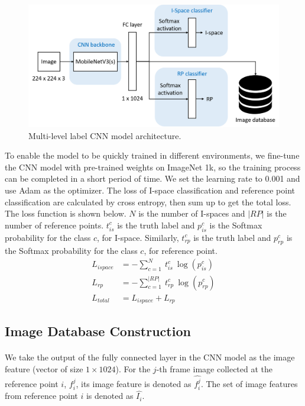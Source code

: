 \documentclass[a4paper,12pt]{report}
\begin{document}
\paragraph{}
\begin{figure}[h]
    \centering
    \includegraphics[width=0.8\columnwidth]{images/chap3/cnn_model.png}
    \caption{Multi-level label CNN model architecture.}
    \label{Fig:cnn_model}
\end{figure}
To enable the model to be quickly trained in different environments, we fine-tune the CNN model with pre-trained weights on ImageNet 1k, so the training process can be completed in a short period of time. We set the learning rate to 0.001 and use Adam as the optimizer. The loss of I-space classification and reference point classification are calculated by cross entropy, then sum up to get the total loss. The loss function is shown below. $N$ is the number of I-spaces and $|RP|$ is the number of reference points. $t_{is}^c$ is the truth label and $p_{is}^c$ is the Softmax probability for the class $c$, for I-space. Similarly, $t_{rp}^c$ is the truth label and $p_{rp}^c$ is the Softmax probability for the class $c$, for reference point.
\begin{align}
    \label{Eq:loss_functions}
    L_{ispace}&=-\sum_{c=1}^N\ t_{is}^c\ \log(p_{is}^c) \\
    L_{rp}&=-\sum_{c=1}^{|RP|}\ t_{rp}^c\ \log(p_{rp}^c) \\
    L_{total}&=L_{ispace}+L_{rp}
\end{align}


\subsection{Image Database Construction}
\paragraph{}
We take the output of the fully connected layer in the CNN model as the image feature (vector of size $1\times1024$). For the $j$-th frame image collected at the reference point $i$, $f_i^j$, its image feature is denoted as $\hat{f_i^j}$. The set of image features from reference point $i$ is denoted as $\hat{I_i}$.
\end{document}
